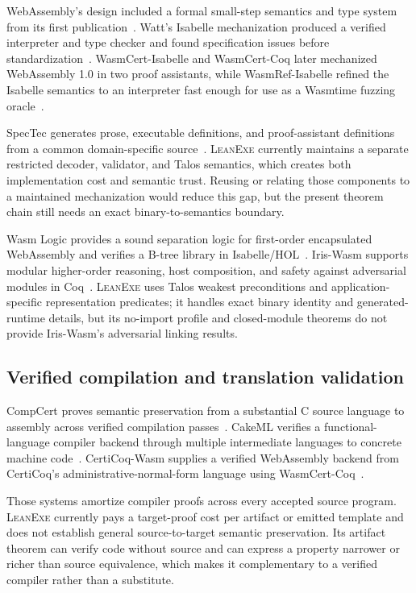 \documentclass[11pt]{article}
\newcommand{\leanexe}{\textsc{LeanExe}}
\begin{document}
WebAssembly's design included a formal small-step semantics and type system from its first publication~\cite{Haas2017WebAssembly}.  Watt's Isabelle mechanization produced a verified interpreter and type checker and found specification issues before standardization~\cite{Watt2018Mechanising}.  WasmCert-Isabelle and WasmCert-Coq later mechanized WebAssembly 1.0 in two proof assistants, while WasmRef-Isabelle refined the Isabelle semantics to an interpreter fast enough for use as a Wasmtime fuzzing oracle~\cite{Watt2021Two,Watt2023WasmRef}.

SpecTec generates prose, executable definitions, and proof-assistant definitions from a common domain-specific source~\cite{Youn2024SpecTec}.  \leanexe{} currently maintains a separate restricted decoder, validator, and Talos semantics, which creates both implementation cost and semantic trust.  Reusing or relating those components to a maintained mechanization would reduce this gap, but the present theorem chain still needs an exact binary-to-semantics boundary.

Wasm Logic provides a sound separation logic for first-order encapsulated WebAssembly and verifies a B-tree library in Isabelle/HOL~\cite{Watt2019WasmLogic}.  Iris-Wasm supports modular higher-order reasoning, host composition, and safety against adversarial modules in Coq~\cite{Rao2023IrisWasm}.  \leanexe{} uses Talos weakest preconditions and application-specific representation predicates; it handles exact binary identity and generated-runtime details, but its no-import profile and closed-module theorems do not provide Iris-Wasm's adversarial linking results.

\subsection{Verified compilation and translation validation}

CompCert proves semantic preservation from a substantial C source language to assembly across verified compilation passes~\cite{Leroy2009CompCert}.  CakeML verifies a functional-language compiler backend through multiple intermediate languages to concrete machine code~\cite{Tan2019CakeML}.  CertiCoq-Wasm supplies a verified WebAssembly backend from CertiCoq's administrative-normal-form language using WasmCert-Coq~\cite{Meier2025CertiCoqWasm}.

Those systems amortize compiler proofs across every accepted source program.  \leanexe{} currently pays a target-proof cost per artifact or emitted template and does not establish general source-to-target semantic preservation.  Its artifact theorem can verify code without source and can express a property narrower or richer than source equivalence, which makes it complementary to a verified compiler rather than a substitute.
\end{document}
